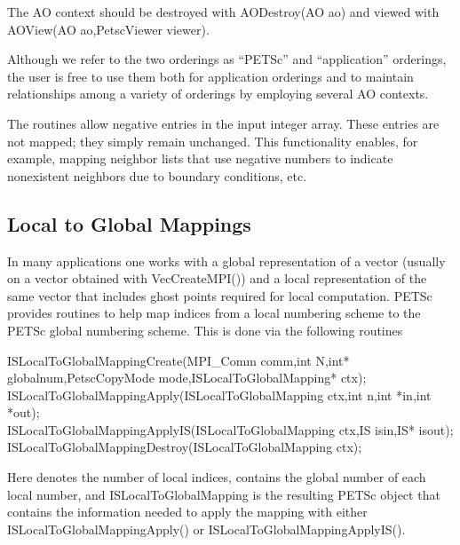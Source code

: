 The AO context should be destroyed with AODestroy(AO ao)
and viewed with AOView(AO ao,PetscViewer viewer).

Although we refer to the two orderings as ``PETSc'' and
``application'' orderings, the user is free to use them both for
application orderings and to maintain relationships among a variety of
orderings by employing several AO contexts.

The  routines allow negative entries in the input
integer array. These entries are not mapped; they simply remain
unchanged.  This functionality enables, for example, mapping neighbor
lists that use negative numbers to indicate nonexistent neighbors due
to boundary conditions, etc.

\subsection{Local to Global Mappings}
\label{sec_islocaltoglobalmapping}

In many applications one works with a global representation of a vector
(usually on a vector obtained with VecCreateMPI()) 
and a local representation of the same vector that includes ghost points 
required for local computation.  
 
PETSc provides routines to help map indices from a local numbering scheme to 
the PETSc global numbering scheme. This is done via the following routines
\begin{tabbing}
  ISLocalToGlobalMappingCreate(MPI\_Comm comm,int N,int* globalnum,PetscCopyMode mode,ISLocalToGlobalMapping* ctx);\\
  ISLocalToGlobalMappingApply(ISLocalToGlobalMapping ctx,int n,int *in,int *out);\\
  ISLocalToGlobalMappingApplyIS(ISLocalToGlobalMapping ctx,IS isin,IS* isout);\\
  ISLocalToGlobalMappingDestroy(ISLocalToGlobalMapping ctx);
\end{tabbing}
Here  denotes the number of local indices,  contains the
global number of each local number, and ISLocalToGlobalMapping is the 
resulting PETSc object that contains the information needed to apply the mapping with 
either ISLocalToGlobalMappingApply() or 
ISLocalToGlobalMappingApplyIS().

